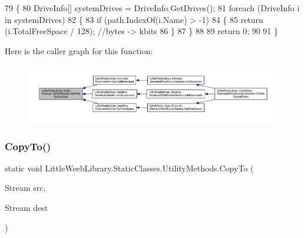 \begin{DoxyCode}
79         \{
80             DriveInfo[] systemDrives = DriveInfo.GetDrives();
81             \textcolor{keywordflow}{foreach} (DriveInfo i \textcolor{keywordflow}{in} systemDrives)
82             \{
83                 \textcolor{keywordflow}{if} (path.IndexOf(i.Name) > -1)
84                 \{
85                     \textcolor{keywordflow}{return} (i.TotalFreeSpace / 128); \textcolor{comment}{//bytes -> kbits}
86                 \}
87             \}
88 
89             \textcolor{keywordflow}{return} 0;
90 
91         \}
\end{DoxyCode}
Here is the caller graph for this function\+:\nopagebreak
\begin{figure}[H]
\begin{center}
\leavevmode
\includegraphics[width=350pt]{class_little_weeb_library_1_1_static_classes_1_1_utility_methods_a76fa2aea99ce4b1ad4130cc18b1d5969_icgraph}
\end{center}
\end{figure}
\mbox{\label{class_little_weeb_library_1_1_static_classes_1_1_utility_methods_a4a514b7e55cf2285f4f16d778164695d}} 
\subsubsection{\texorpdfstring{Copy\+To()}{CopyTo()}}
{\footnotesize\ttfamily static void Little\+Weeb\+Library.\+Static\+Classes.\+Utility\+Methods.\+Copy\+To (\begin{DoxyParamCaption}\item[{Stream}]{src,  }\item[{Stream}]{dest }\end{DoxyParamCaption})\hspace{0.3cm}{\ttfamily [static]}}



